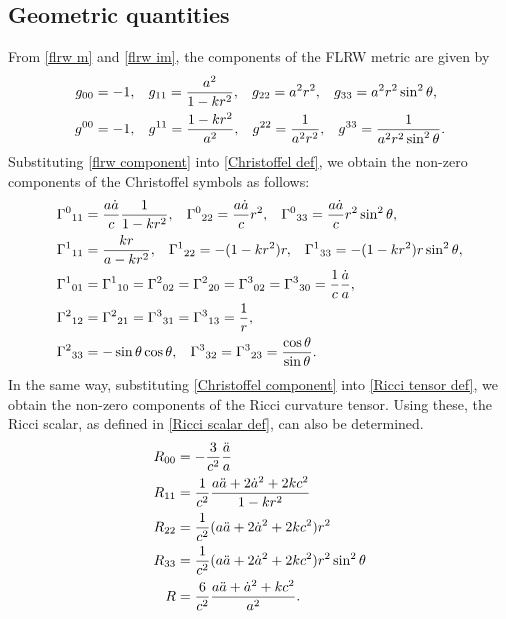 \documentclass[12pt]{article}
\numberwithin{equation}{section}
\begin{document}
\subsection{Geometric quantities}
From \eqref{flrw m} and \eqref{flrw im}, the components of the FLRW metric are given by
\begin{align}\label{flrw component}
    g_{00} &= -1,\hspace{0.3cm} g_{11} = \frac{a^2}{1 - kr^2},\hspace{0.3cm} g_{22} = a^2 r^2,\hspace{0.3cm} g_{33} = a^2 r^2 \sin^2\theta, \notag\\
    g^{00} &= -1,\hspace{0.3cm} g^{11} = \frac{1 - kr^2}{a^2},\hspace{0.3cm} g^{22} = \frac{1}{a^2 r^2},\hspace{0.3cm} g^{33} = \frac{1}{a^2 r^2 \sin^2\theta}.
\end{align}
Substituting \eqref{flrw component} into \eqref{Christoffel def}, we obtain the non-zero components of the Christoffel symbols as follows:
\begin{align}\label{Christoffel component}
   {\Gamma^{0}}_{11} &= \frac{a\dot{a}}{c}\frac{1}{1 - kr^2},\hspace{0.3cm} {\Gamma^{0}}_{22} = \frac{a\dot{a}}{c}r^2,\hspace{0.3cm} {\Gamma^{0}}_{33} = \frac{a\dot{a}}{c}r^2\sin^2\theta, \notag\\
   {\Gamma^{1}}_{11} &= \frac{kr}{a - kr^2},\hspace{0.3cm} {\Gamma^{1}}_{22} = -(1 - kr^2)r,\hspace{0.3cm} {\Gamma^{1}}_{33} = -(1 - kr^2)r\sin^2\theta, \notag\\
   {\Gamma^{1}}_{01} &= {\Gamma^{1}}_{10} = {\Gamma^{2}}_{02} = {\Gamma^{2}}_{20} = {\Gamma^{3}}_{02} = {\Gamma^{3}}_{30} = \frac{1}{c}\frac{\dot{a}}{a}, \notag\\
   {\Gamma^{2}}_{12} &= {\Gamma^{2}}_{21} = {\Gamma^{3}}_{31} = {\Gamma^{3}}_{13} = \frac{1}{r}, \notag\\
   {\Gamma^{2}}_{33} &= -\sin\theta\cos\theta,\hspace{0.3cm} {\Gamma^{3}}_{32} = {\Gamma^{3}}_{23} = \frac{\cos\theta}{\sin\theta}.
\end{align}
In the same way, substituting \eqref{Christoffel component} into \eqref{Ricci tensor def}, we obtain the non-zero components of the Ricci curvature tensor. Using these, the Ricci scalar, as defined in \eqref{Ricci scalar def}, can also be determined.
\begin{align}\label{Ricci tensor component}
    R_{00} &= -\frac{3}{c^2}\frac{\ddot{a}}{a} \notag\\
    R_{11} &= \frac{1}{c^2}\frac{a\ddot{a} + 2\dot{a}^2 + 2kc^2}{1 - kr^2} \notag\\
    R_{22} &= \frac{1}{c^2}(a\ddot{a} + 2\dot{a}^2 + 2kc^2)r^2 \notag\\
    R_{33} &= \frac{1}{c^2}(a\ddot{a} + 2\dot{a}^2 + 2kc^2)r^2\sin^2\theta \notag\\
    R &= \frac{6}{c^2}\frac{a\ddot{a} + \dot{a}^2 + kc^2}{a^2}.
\end{align}
\end{document}
